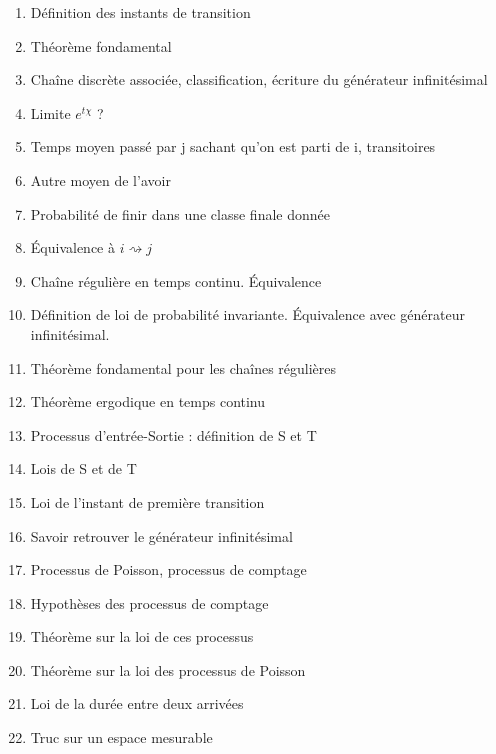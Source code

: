 \documentclass{article}
\begin{document}
\begin{enumerate}
\item Définition des instants de transition
\item Théorème fondamental
\item Chaîne discrète associée, classification, écriture du générateur infinitésimal
\item Limite $e^{t\chi}$ ?
\item Temps moyen passé par j sachant qu'on est parti de i, transitoires
\item Autre moyen de l'avoir
\item Probabilité de finir dans une classe finale donnée
\item Équivalence à $i\rightsquigarrow j$
\item Chaîne régulière en temps continu. Équivalence
\item Définition de loi de probabilité invariante. Équivalence avec générateur infinitésimal.
\item Théorème fondamental pour les chaînes régulières
\item Théorème ergodique en temps continu
\item Processus d'entrée-Sortie : définition de S et T
\item Lois de S et de T
\item Loi de l'instant de première transition
\item Savoir retrouver le générateur infinitésimal
\item Processus de Poisson, processus de comptage
\item Hypothèses des processus de comptage
\item Théorème sur la loi de ces processus
\item Théorème sur la loi des processus de Poisson
\item Loi de la durée entre deux arrivées
\item Truc sur un espace mesurable
\end{enumerate}
\end{document}
